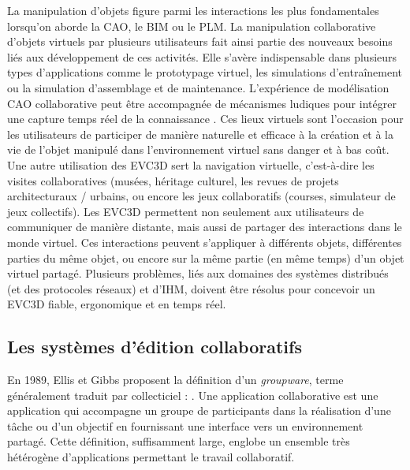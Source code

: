 La manipulation d'objets figure parmi les interactions les plus fondamentales 
lorsqu'on 
aborde la \gls{CAO}, le \gls{BIM} ou le \gls{PLM}. La manipulation 
collaborative d'objets virtuels par plusieurs utilisateurs fait ainsi partie des 
nouveaux 
besoins liés aux développement de ces activités.
Elle s'avère indispensable dans plusieurs types 
d'applications comme le prototypage virtuel, les simulations d'entraînement ou la 
simulation d'assemblage et de maintenance. L'expérience de modélisation 
\gls{CAO} collaborative peut être accompagnée de mécanismes ludiques pour 
intégrer une capture temps réel de la connaissance \cite{Kosmadoudi2013}.
Ces lieux virtuels sont l'occasion pour les utilisateurs de participer de manière 
naturelle et efficace à la création et à la vie de l'objet manipulé dans 
l'environnement virtuel sans danger et à bas coût. 
Une autre utilisation des \gls{EVC3D} sert la navigation virtuelle, c'est-à-dire les 
visites collaboratives (musées, héritage culturel, les revues de projets 
architecturaux / urbains, ou encore les jeux collaboratifs (courses, simulateur de 
jeux collectifs). 
Les \gls{EVC3D} permettent non seulement aux utilisateurs de communiquer de 
manière distante, mais aussi de partager des 
interactions dans le monde virtuel. 
Ces interactions peuvent s'appliquer à différents objets, différentes parties du 
même objet, ou encore sur la même partie (en même temps) d'un objet virtuel 
partagé.
Plusieurs problèmes, liés aux domaines des systèmes distribués (et des 
protocoles 
réseaux) et d'\acrshort{IHM}, doivent être résolus pour concevoir un 
\gls{EVC3D} fiable, ergonomique et en temps réel. 



\subsection{Les systèmes d'édition collaboratifs}
En 1989, Ellis et Gibbs proposent la définition d'un \textit{groupware}, terme 
généralement traduit par collecticiel : 
. 
Une application collaborative est une application qui accompagne un groupe de 
participants dans la réalisation d'une tâche ou d'un objectif en fournissant une 
interface vers un environnement partagé. 
Cette définition, suffisamment large, englobe un ensemble très hétérogène d'applications 
permettant le travail collaboratif. 

